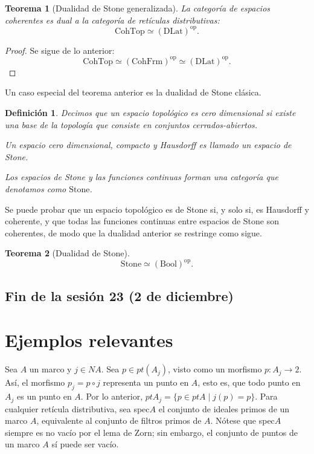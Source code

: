 \documentclass[12pt,letterpaper,titlepage]{article}
\newtheorem*{defn}{Definición}
\newtheorem{thm}{Teorema}
\theoremstyle{definition}
\newcommand\<{\langle}
\renewcommand\>{\rangle}
\newcommand{\DLat}{\mathrm{DLat}}
\newcommand{\Bool}{\mathrm{Bool}}
\newcommand{\CohFrm}{\mathrm{CohFrm}}
\newcommand{\CohTop}{\mathrm{CohTop}}
\newcommand{\Stone}{\mathrm{Stone}}
\newcommand{\op}{\mathrm{op}}
\begin{document}
\begin{thm}[Dualidad de Stone generalizada]
    La categoría de espacios coherentes es dual
    a la categoría de retículas distributivas:
    \[
        \CohTop \simeq (\DLat)^\op
    .\]
\end{thm}
\begin{proof}
    Se sigue de lo anterior:
    \[
        \CohTop \simeq (\CohFrm)^\op \simeq (\DLat)^\op
    .\]
\end{proof}

Un caso especial del teorema anterior es
la dualidad de Stone clásica.

\begin{defn}
    Decimos que un espacio topológico es cero dimensional
    si existe una base de la topología que consiste en
    conjuntos cerrados-abiertos.
    
    Un espacio cero dimensional, compacto y Hausdorff es llamado
    un espacio de Stone.
    
    Los espacios de Stone y las funciones continuas forman
    una categoría que denotamos como $\Stone$.
\end{defn}

Se puede probar que un espacio topológico es de Stone
si, y solo si, es Hausdorff y coherente,
y que todas las funciones continuas entre espacios de Stone
son coherentes, de modo que la dualidad anterior
se restringe como sigue.

\begin{thm}[Dualidad de Stone]
    \[
        \Stone \simeq (\Bool)^\op.
    \]
\end{thm}

\subsection*{Fin de la sesión 23 (2 de diciembre)}
\section{Ejemplos relevantes}
Sea $A$ un marco y $j\in NA$. Sea $p\in pt(A_j)$, visto como un morfismo $p:A_j\to 2$. Así, el morfismo $p_j=p\circ j$ representa un punto en $A$, esto es, que todo punto en $A_j$ es un punto en $A$. Por lo anterior, $ptA_j=\{p\in ptA \mid j(p)=p\}$.
 Para cualquier retícula distributiva, sea spec$A$ el conjunto de ideales primos de un marco $A$, equivalente al conjunto de filtros primos de $A$. Nótese que spec$A$ siempre es no vacío por el lema de Zorn; sin embargo, el conjunto de puntos de un marco $A$ sí puede ser vacío.
 
\end{document}

